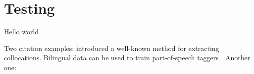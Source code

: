 \section{Testing}

Hello world 

Two citation examples: 
\cite{dunning1993} introduced a well-known method for extracting
collocations. Bilingual data can be used to train part-of-speech
taggers \citep{das2011}. Another one: \citep{cortes2014}
